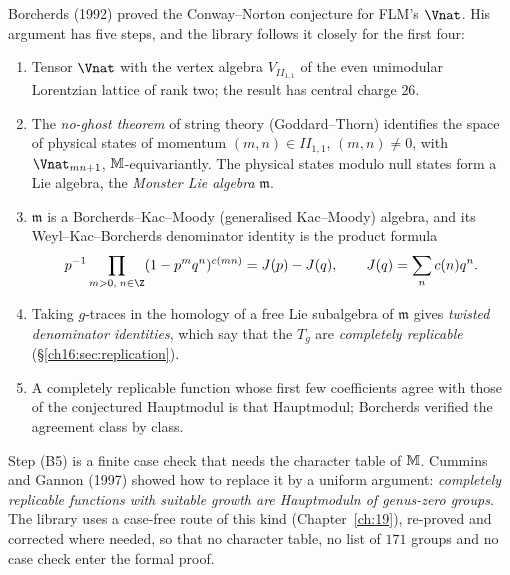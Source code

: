 Borcherds (1992) proved the Conway--Norton conjecture for FLM's $\Vnat$.  His argument has five steps, and the
library follows it closely for the first four:
\begin{enumerate}[label=(B\arabic*)]
\item Tensor $\Vnat$ with the vertex algebra $V_{I\!I_{1,1}}$ of the even unimodular Lorentzian lattice of rank
  two; the result has central charge $26$.
\item The \emph{no-ghost theorem} of string theory (Goddard--Thorn) identifies the space of physical states of
  momentum $(m,n)\in I\!I_{1,1}$, $(m,n)\ne0$, with $\Vnat_{mn+1}$, $\mathbb{M}$-equivariantly.  The physical states
  modulo null states form a Lie algebra, the \emph{Monster Lie algebra} $\mathfrak m$.
\item $\mathfrak m$ is a Borcherds--Kac--Moody (generalised Kac--Moody) algebra, and its Weyl--Kac--Borcherds
  denominator identity is the product formula
  \begin{equation}\label{ch16:eq:denominator}
    p^{-1}\prod_{m>0,\;n\in\Z}(1-p^mq^n)^{c(mn)} = J(p)-J(q),\qquad J(q)=\sum_n c(n)q^n .
  \end{equation}
\item Taking $g$-traces in the homology of a free Lie subalgebra of $\mathfrak m$ gives \emph{twisted denominator
  identities}, which say that the $T_g$ are \emph{completely replicable} (\S\ref{ch16:sec:replication}).
\item A completely replicable function whose first few coefficients agree with those of the conjectured Hauptmodul
  is that Hauptmodul; Borcherds verified the agreement class by class.
\end{enumerate}
Step (B5) is a finite case check that needs the character table of $\mathbb{M}$.  Cummins and Gannon (1997) showed
how to replace it by a uniform argument: \emph{completely replicable functions with suitable growth are Hauptmoduln of
genus-zero groups}.  The library uses a case-free route of this kind (Chapter~\ref{ch:19}), re-proved and corrected
where needed, so that no character table, no list of $171$ groups and no case check enter the formal proof.

